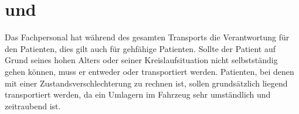 \nocite{KirschnickPflege2}





\needspace{0.5\textheight}
\section{ und }

\Text
{{\TxBeschreibung}}%
{%
%
%
Das Fachpersonal hat während des gesamten Transports die
Verantwortung für den Patienten, dies gilt auch für gehfähige
Patienten. Sollte der Patient auf Grund seines hohen Alters
oder seiner Kreislaufsituation nicht selbstständig gehen
können, muss er entweder  oder 
transportiert werden. 
Patienten, bei denen mit einer Zustandsverschlechterung zu
rechnen ist, sollen grundsätzlich liegend
transportiert werden, da ein Umlagern im Fahrzeug sehr
umständlich und zeitraubend ist.
}%











\subsection{}

